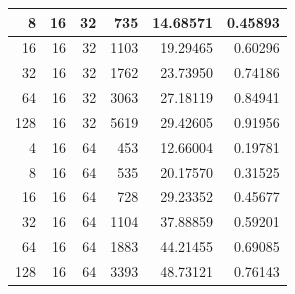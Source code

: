 \documentclass[journal,transmag]{IEEEtran}
\begin{document}
\begin{table}[h]
\begin{tabular}{|r|r|r|r|r|r|}
		8                             & 16                         & 32                               & 735                            & 14.68571                      & 0.45893                         \\ \hline
		16                            & 16                         & 32                               & 1103                           & 19.29465                      & 0.60296                         \\ \hline
		32                            & 16                         & 32                               & 1762                           & 23.73950                      & 0.74186                         \\ \hline
		64                            & 16                         & 32                               & 3063                           & 27.18119                      & 0.84941                         \\ \hline
		128                           & 16                         & 32                               & 5619                           & 29.42605                      & 0.91956                         \\ \hline
		4                             & 16                         & 64                               & 453                            & 12.66004                      & 0.19781                         \\ \hline
		8                             & 16                         & 64                               & 535                            & 20.17570                      & 0.31525                         \\ \hline
		16                            & 16                         & 64                               & 728                            & 29.23352                      & 0.45677                         \\ \hline
		32                            & 16                         & 64                               & 1104                           & 37.88859                      & 0.59201                         \\ \hline
		64                            & 16                         & 64                               & 1883                           & 44.21455                      & 0.69085                         \\ \hline
		128                           & 16                         & 64                               & 3393                           & 48.73121                      & 0.76143                         \\ \hline

\end{tabular}
\end{table}
\end{document}
